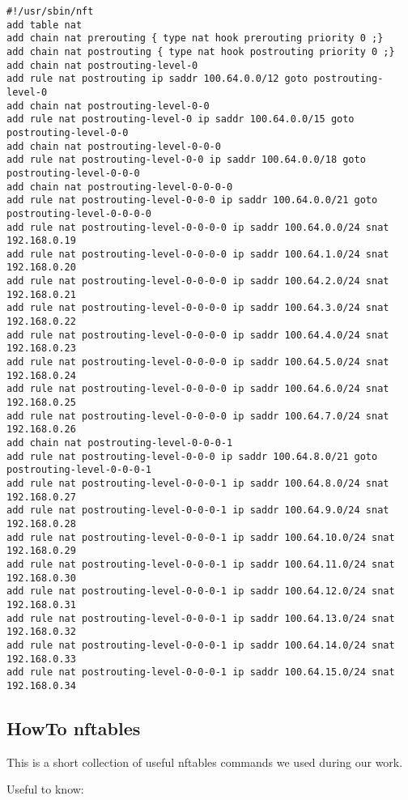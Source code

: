 \documentclass{report}
\begin{document}
\begin{verbatim}
#!/usr/sbin/nft
add table nat
add chain nat prerouting { type nat hook prerouting priority 0 ;}
add chain nat postrouting { type nat hook postrouting priority 0 ;}
add chain nat postrouting-level-0
add rule nat postrouting ip saddr 100.64.0.0/12 goto postrouting-level-0
add chain nat postrouting-level-0-0
add rule nat postrouting-level-0 ip saddr 100.64.0.0/15 goto postrouting-level-0-0
add chain nat postrouting-level-0-0-0
add rule nat postrouting-level-0-0 ip saddr 100.64.0.0/18 goto postrouting-level-0-0-0
add chain nat postrouting-level-0-0-0-0
add rule nat postrouting-level-0-0-0 ip saddr 100.64.0.0/21 goto postrouting-level-0-0-0-0
add rule nat postrouting-level-0-0-0-0 ip saddr 100.64.0.0/24 snat 192.168.0.19
add rule nat postrouting-level-0-0-0-0 ip saddr 100.64.1.0/24 snat 192.168.0.20
add rule nat postrouting-level-0-0-0-0 ip saddr 100.64.2.0/24 snat 192.168.0.21
add rule nat postrouting-level-0-0-0-0 ip saddr 100.64.3.0/24 snat 192.168.0.22
add rule nat postrouting-level-0-0-0-0 ip saddr 100.64.4.0/24 snat 192.168.0.23
add rule nat postrouting-level-0-0-0-0 ip saddr 100.64.5.0/24 snat 192.168.0.24
add rule nat postrouting-level-0-0-0-0 ip saddr 100.64.6.0/24 snat 192.168.0.25
add rule nat postrouting-level-0-0-0-0 ip saddr 100.64.7.0/24 snat 192.168.0.26
add chain nat postrouting-level-0-0-0-1
add rule nat postrouting-level-0-0-0 ip saddr 100.64.8.0/21 goto postrouting-level-0-0-0-1
add rule nat postrouting-level-0-0-0-1 ip saddr 100.64.8.0/24 snat 192.168.0.27
add rule nat postrouting-level-0-0-0-1 ip saddr 100.64.9.0/24 snat 192.168.0.28
add rule nat postrouting-level-0-0-0-1 ip saddr 100.64.10.0/24 snat 192.168.0.29
add rule nat postrouting-level-0-0-0-1 ip saddr 100.64.11.0/24 snat 192.168.0.30
add rule nat postrouting-level-0-0-0-1 ip saddr 100.64.12.0/24 snat 192.168.0.31
add rule nat postrouting-level-0-0-0-1 ip saddr 100.64.13.0/24 snat 192.168.0.32
add rule nat postrouting-level-0-0-0-1 ip saddr 100.64.14.0/24 snat 192.168.0.33
add rule nat postrouting-level-0-0-0-1 ip saddr 100.64.15.0/24 snat 192.168.0.34
\end{verbatim}

\subsection{HowTo nftables} 

This is a short collection of useful nftables commands we used during
our work.

Useful to know:
\end{document}
